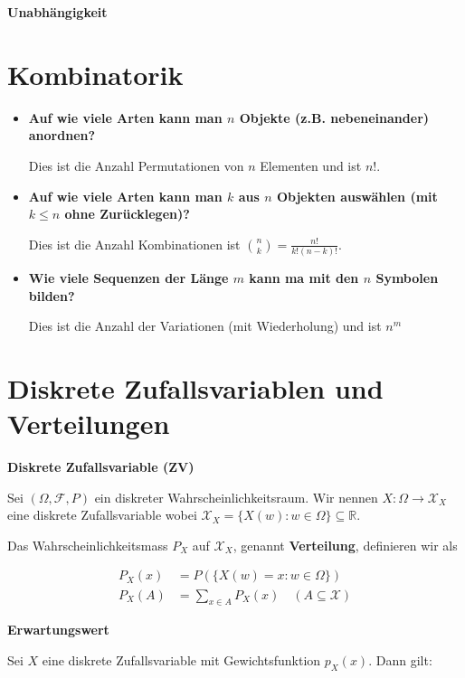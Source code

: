 \documentclass[25pt]{sciposter}
\newcommand{\R}{\mathbb{R}}
\newcommand{\F}{\mathcal{F}}
\newcommand{\X}{\mathcal{X}}
\newenvironment{method}[1]{\begin{mdframed}[backgroundcolor=blue!10,innertopmargin=15pt, innerbottommargin=15pt]
		\textbf{#1 }
	}
	{ 
	\end{mdframed}
}
\newcommand{\TODO}[1]{\todo[inline]{\Large TODO:  #1}}
\begin{document}
\begin{multicols}{3}
\begin{method}{Unabhängigkeit}
\end{method}





\section*{Kombinatorik}

\begin{itemize}
	\item \textbf{Auf wie viele Arten kann man $n$ Objekte (z.B. nebeneinander) anordnen?}
	
	Dies ist die Anzahl Permutationen von $n$ Elementen und ist $n!$.
	
	
	\item 	\textbf{Auf wie viele Arten kann man $k$ aus $n$ Objekten auswählen (mit $k\leq n$ ohne Zurücklegen)?}
	
	Dies ist die Anzahl Kombinationen ist $\binom{n}{k} = \frac{n!}{k!(n-k)!}$.
	
	
	\item \textbf{Wie viele Sequenzen der Länge $m$ kann ma mit den $n$ Symbolen bilden?}
	
	Dies ist die Anzahl der Variationen (mit Wiederholung) und ist $n^m$
\end{itemize}


\section*{Diskrete Zufallsvariablen und Verteilungen}



\begin{method}{Diskrete Zufallsvariable (ZV)}
	Sei $(\Omega, \F, P)$ ein diskreter Wahrscheinlichkeitsraum. Wir nennen $X : \Omega \to \X_X$ eine diskrete Zufallsvariable wobei $\X_X =  \{ X(w) : w\in\Omega\}\subseteq \R$.
	
	
	Das Wahrscheinlichkeitsmass $P_X$ auf $\X_X$, genannt \textbf{Verteilung}, definieren wir als
	
	\begin{align*}
	P_X(x) &= P(\{ X(w) = x : w\in\Omega\})\\
	P_X(A) &= \sum_{x\in A} P_X(x)  \quad (A\subseteq\X)
	\end{align*}

\end{method}

\TODO{check ? below}
\begin{method}{Erwartungswert}
	Sei $X$ eine diskrete Zufallsvariable mit Gewichtsfunktion $p_X(x)$. Dann gilt:
	

\end{method}
\end{multicols}
\end{document}
